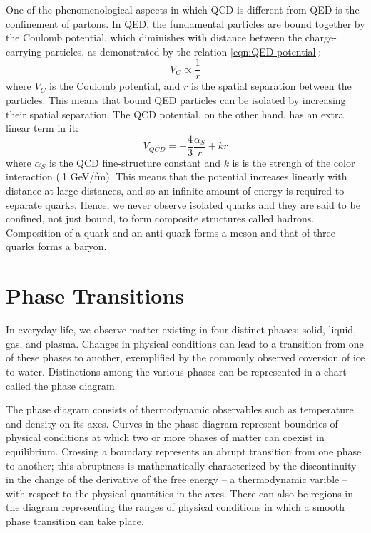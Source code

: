 One of the phenomenological aspects in which QCD is different from QED is the confinement of partons. In QED, the fundamental particles are bound together by the Coulomb potential, which diminishes with distance between the charge-carrying particles, as demonstrated by the relation \ref{eqn:QED-potential}:
\begin{equation}\label{eqn:QED-potential}
V_{C}\propto\frac{1}{r} 
\end{equation}
where $V_{C}$ is the Coulomb potential, and $r$ is the spatial separation between the particles. This means that bound QED particles can be isolated by increasing their spatial separation. The QCD potential, on the other hand, has an extra linear term in it:
\begin{equation}\label{eqn:QCD-potential}
V_{QCD} = -\frac{4}{3}\frac{\alpha_{S}}{r} + {k}{r} 
\end{equation}
where $\alpha_{S}$ is the QCD fine-structure constant and $k$ is is the strengh of the color interaction ($~$1 GeV/fm). This means that the potential increases linearly with distance at large distances, and so an infinite amount of energy is required to separate quarks. Hence, we never observe isolated quarks and they are said to be confined, not just bound, to form composite structures called hadrons.\cite{0954-3899-32-3-R01} Composition of a quark and an anti-quark forms a meson and that of three quarks forms a baryon.

\section{Phase Transitions}
In everyday life, we observe matter existing in four distinct phases: solid, liquid, gas, and plasma. Changes in physical conditions can lead to a transition from one of these phases to another, exemplified by the commonly observed coversion of ice to water. Distinctions among the various phases can be represented in a chart called the phase diagram.

The phase diagram consists of thermodynamic observables such as temperature and density on its axes. Curves in the phase diagram represent boundries of physical conditions at which two or more phases of matter can coexist in equilibrium. Crossing a boundary represents an abrupt transition from one phase to another; this abruptness is mathematically characterized by the discontinuity in the change of the derivative of the free energy -- a thermodynamic varible -- with respect to the physical quantities in the axes. There can also be regions in the diagram representing the ranges of physical conditions in which a smooth phase transition can take place.

